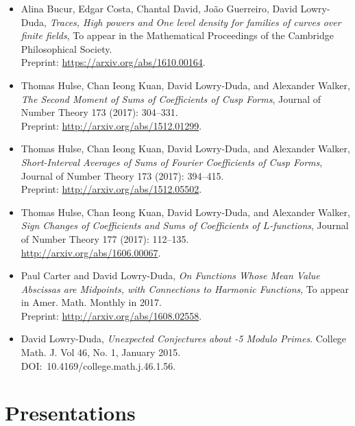\begin{itemize}

  \item Alina Bucur, Edgar Costa, Chantal David, Jo\~{a}o Guerreiro, David Lowry-Duda,
    \emph{Traces, High powers and One level density for families of curves over finite fields},
    To appear in the Mathematical Proceedings of the Cambridge Philosophical Society. \\
    Preprint: \url{https://arxiv.org/abs/1610.00164}.

  \item Thomas Hulse, Chan Ieong Kuan, David Lowry-Duda, and Alexander Walker,
    \emph{The Second Moment of Sums of Coefficients of Cusp Forms},
    Journal of Number Theory 173 (2017): 304--331. \\
    Preprint: \url{http://arxiv.org/abs/1512.01299}.

  \item Thomas Hulse, Chan Ieong Kuan, David Lowry-Duda, and Alexander Walker,
    \emph{Short-Interval Averages of Sums of Fourier Coefficients of Cusp Forms},
    Journal of Number Theory 173 (2017): 394--415. \\
    Preprint: \url{http://arxiv.org/abs/1512.05502}.

  \item Thomas Hulse, Chan Ieong Kuan, David Lowry-Duda, and Alexander Walker,
    \emph{Sign Changes of Coefficients and Sums of Coefficients of $L$-functions},
    Journal of Number Theory 177 (2017): 112--135. \\
    \url{http://arxiv.org/abs/1606.00067}.

  \item Paul Carter and David Lowry-Duda,
    \emph{On Functions Whose Mean Value Abscissas are Midpoints, with Connections to Harmonic Functions},
    To appear in Amer. Math. Monthly in 2017. \\
    Preprint: \url{http://arxiv.org/abs/1608.02558}.

  \item David Lowry-Duda,
    \emph{Unexpected Conjectures about -5 Modulo Primes}.
    College Math. J. Vol 46, No. 1, January 2015.\\
    DOI:\ 10.4169/college.math.j.46.1.56.

\end{itemize}


\section*{Presentations}

